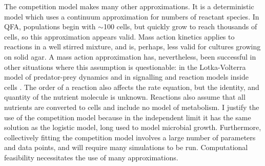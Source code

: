 The competition model makes many other approximations. It is a
deterministic model which uses a continuum approximation for numbers
of reactant species. In QFA, populations begin with \(\sim\)100 cells,
but quickly grow to reach thousands of cells, so this approximation
appears valid. Mass action kinetics applies to reactions in a well
stirred mixture, and is, perhaps, less valid for cultures growing on
solid agar. A mass action approximation has, nevertheless, been
successful in other situations where this assumption is questionable:
in the Lotka-Volterra model of predator-prey dynamics
\citep{Berryman1992} and in signalling and reaction models inside
cells \citep{Aldridge2006,Chen2010}. The order of a reaction also
affects the rate equation, but the identity, and quantity of the
nutrient molecule is unknown. Reactions also assume that all nutrients
are converted to cells and include no model of metabolism. I justify
the use of the competition model because in the independent limit it
has the same solution as the logistic model, long used to model
microbial growth. Furthermore, collectively fitting the competition
model involves a large number of parameters and data points, and will
require many simulations to be run. Computational feasibility
necessitates the use of many approximations.



